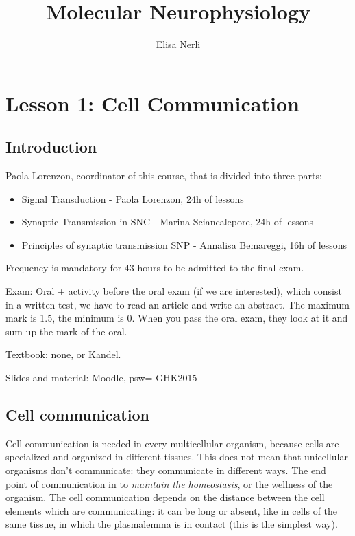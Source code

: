 \documentclass[a4paper, 12pt]{book}
\begin{document}
\author{Elisa Nerli}
\title{Molecular Neurophysiology}
\maketitle
\newpage
\tableofcontents
\newpage



\chapter{Lesson 1: Cell Communication}

\section{Introduction}
Paola Lorenzon, coordinator of this course, that is divided into three parts:
\begin{itemize}
\item{Signal Transduction - Paola Lorenzon, 24h of lessons}
\item{Synaptic Transmission in SNC - Marina Sciancalepore, 24h of lessons}
\item{Principles of synaptic transmission SNP - Annalisa Bemareggi, 16h of lessons}
\end{itemize}

Frequency is mandatory for 43 hours to be admitted to the final exam.

Exam: Oral + activity before the oral exam (if we are interested), which consist in a written test, we have to read an article and write an abstract. The maximum mark is 1.5, the minimum is 0. When you pass the oral exam, they look at it and sum up the mark of the oral.

Textbook: none, or Kandel.

Slides and material: Moodle, psw= GHK2015


\section{Cell communication}
Cell communication is needed in every multicellular organism, because cells are specialized and organized in different tissues. This does not mean that unicellular organisms don't communicate: they communicate in different ways. The end point of communication in to \emph{maintain the homeostasis}, or the wellness of the organism. The cell communication depends on the distance between the cell elements which are communicating: it can be long or absent,  like in cells of the same tissue, in which the plasmalemma is in contact (this is the simplest way).
\end{document}
